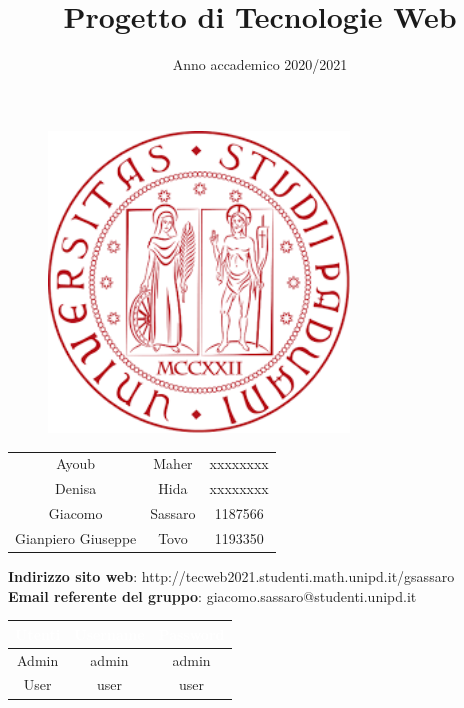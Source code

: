 \documentclass[12pt,a4paper]{article}
\title{Progetto di Tecnologie Web}
\author{}
\date{Anno accademico 2020/2021}
\begin{document}
\maketitle
\begin{figure}[H]
	\centering
	\includegraphics[width=8cm]{utility/logo.png}
\end{figure}
\begin{table}[H]
	\centering
	\renewcommand{\arraystretch}{2}
	\begin{longtable}{c c c}
		\rowcolor{green}\multicolumn{3}{c }{\textcolor{white}{\textbf{Componenti}}}\\
		\endhead
		 Ayoub & Maher & xxxxxxxx \\
		 Denisa & Hida & xxxxxxxx \\
		 Giacomo & Sassaro & 1187566 \\
		 Gianpiero Giuseppe & Tovo & 1193350 \\
	\end{longtable}
\end{table}

\begin{center}
	\textbf{Indirizzo sito web}: http://tecweb2021.studenti.math.unipd.it/gsassaro\\
	\textbf{Email referente del gruppo}: giacomo.sassaro@studenti.unipd.it
\end{center}

\begin{table}[H]
	\centering
	\renewcommand{\arraystretch}{2}
	\begin{longtable}{c | c c}
		\rowcolor{green}\textcolor{white}{\textbf{Utenti}} & \textcolor{white}{\textbf{Username}} & \textcolor{white}{\textbf{Password}}\\
		\endhead
		Admin & admin & admin\\
		User & user  & user \\
	\end{longtable}
\end{table}
\newpage
{}
\tableofcontents
\newpage

\newpage

\newpage

\newpage

\newpage

\end{document}
